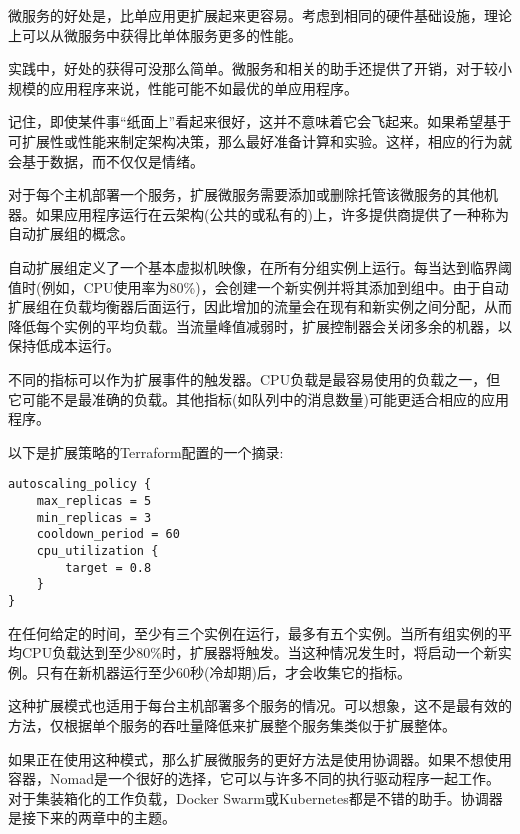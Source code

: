 
微服务的好处是，比单应用更扩展起来更容易。考虑到相同的硬件基础设施，理论上可以从微服务中获得比单体服务更多的性能。

实践中，好处的获得可没那么简单。微服务和相关的助手还提供了开销，对于较小规模的应用程序来说，性能可能不如最优的单应用程序。

记住，即使某件事“纸面上”看起来很好，这并不意味着它会飞起来。如果希望基于可扩展性或性能来制定架构决策，那么最好准备计算和实验。这样，相应的行为就会基于数据，而不仅仅是情绪。


对于每个主机部署一个服务，扩展微服务需要添加或删除托管该微服务的其他机器。如果应用程序运行在云架构(公共的或私有的)上，许多提供商提供了一种称为自动扩展组的概念。

自动扩展组定义了一个基本虚拟机映像，在所有分组实例上运行。每当达到临界阈值时(例如，CPU使用率为80\%)，会创建一个新实例并将其添加到组中。由于自动扩展组在负载均衡器后面运行，因此增加的流量会在现有和新实例之间分配，从而降低每个实例的平均负载。当流量峰值减弱时，扩展控制器会关闭多余的机器，以保持低成本运行。

不同的指标可以作为扩展事件的触发器。CPU负载是最容易使用的负载之一，但它可能不是最准确的负载。其他指标(如队列中的消息数量)可能更适合相应的应用程序。

以下是扩展策略的Terraform配置的一个摘录:

\begin{lstlisting}[style=styleCXX]
autoscaling_policy {
	max_replicas = 5
	min_replicas = 3
	cooldown_period = 60
	cpu_utilization {
		target = 0.8
	}
}
\end{lstlisting}

在任何给定的时间，至少有三个实例在运行，最多有五个实例。当所有组实例的平均CPU负载达到至少80\%时，扩展器将触发。当这种情况发生时，将启动一个新实例。只有在新机器运行至少60秒(冷却期)后，才会收集它的指标。


这种扩展模式也适用于每台主机部署多个服务的情况。可以想象，这不是最有效的方法，仅根据单个服务的吞吐量降低来扩展整个服务集类似于扩展整体。

如果正在使用这种模式，那么扩展微服务的更好方法是使用协调器。如果不想使用容器，Nomad是一个很好的选择，它可以与许多不同的执行驱动程序一起工作。对于集装箱化的工作负载，Docker Swarm或Kubernetes都是不错的助手。协调器是接下来的两章中的主题。





